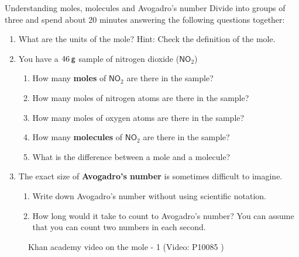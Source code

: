 \label{m38717*secfhsst!!!underscore!!!id832}
            \begin{groupdiscussion}{Understanding moles, molecules and Avogadro's number
      }
            \nopagebreak
      \label{m38717*id279596}Divide into groups of three and spend about 20 minutes answering the following questions together:\par 
      \label{m38717*id279603}\begin{enumerate}[noitemsep, label=\textbf{\arabic*}. ] 
            \label{m38717*uid39}\item What are the units of the mole? Hint: Check the definition of the mole.
\label{m38717*uid40}\item You have a $46\phantom{\rule{2pt}{0ex}}\mathsf{g}$ sample of nitrogen dioxide ($\mathsf{NO}_{2}$)
\label{m38717*id279631}\begin{enumerate}[noitemsep, label=\textbf{\alph*}. ] 
            \label{m38717*uid41}\item How many \textbf{moles} of $\mathsf{NO}_{2}$ are there in the sample?
\item How many moles of nitrogen atoms are there in the sample?
\item How many moles of oxygen atoms are there in the sample?
\label{m38717*uid42}\item How many \textbf{molecules} of $\mathsf{NO}_{2}$ are there in the sample?
\label{m38717*uid43}\item What is the difference between a mole and a molecule?
\end{enumerate}
        \label{m38717*uid44}\item The exact size of \textbf{Avogadro's number} is sometimes difficult to imagine.
\label{m38717*id279703}\begin{enumerate}[noitemsep, label=\textbf{\alph*}. ] 
            \label{m38717*uid45}\item Write down Avogadro's number without using scientific notation.
\label{m38717*uid46}\item How long would it take to count to Avogadro's number? You can assume that you can count two numbers in each second.
\end{enumerate}
        \end{enumerate}
\end{groupdiscussion}
\label{m38717*eip-945}
    \setcounter{subfigure}{0}
	\begin{figure}[H] %
    \textnormal{Khan academy video on the mole - 1}\vspace{.1in} \nopagebreak
  \label{m38717*yt-media2}\label{m38717*yt-video2}
             { (Video:  P10085 )}
      \vspace{2pt}
    \vspace{.1in}
 \end{figure}       \par \label{m38717*secfhsst!!!underscore!!!id850}
